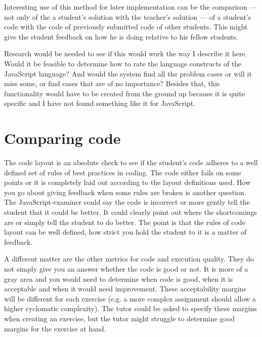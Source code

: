 Interesting use of this method for later implementation can be the comparison
--- not only of the a student's solution with the teacher's solution --- of a
student's code with the code of previously submitted code of other
students. This might give the student feedback on how he is doing relative to
his fellow students.

Research would be needed to see if this would work the way I describe it
here. Would it be feasible to determine how to rate the language constructs of
the JavaScript language? And would the system find all the problem cases or
will it miss some, or find cases that are of no importance?  Besides that, this
functionality would have to be created from the ground up because it is quite
specific and I have not found something like it for JavaScript.

\section{Comparing code}

The code layout is an absolute check to see if the student's code adheres to a
well defined set of rules of best practices in coding. The code either fails on
some points or it is completely laid out according to the layout definitions
used. How you go about giving feedback when some rules are broken is another
question. The JavaScript-examiner could say the code is incorrect or more
gently tell the student that it could be better. It could clearly point out
where the shortcomings are or simply tell the student to do better. The point
is that the rules of code layout can be well defined, how strict you hold the
student to it is a matter of feedback.

A different matter are the other metrics for code and execution quality. They
do not simply give you an answer whether the code is good or not. It is more of
a gray area and you would need to determine when code is good, when it is
acceptable and when it would need improvement. These acceptability margins will
be different for each exercise (e.g. a more complex assignment should allow a
higher cyclomatic complexity). The tutor could be asked to specify these
margins when creating an exercise, but the tutor might struggle to determine
good margins for the exercise at hand.

